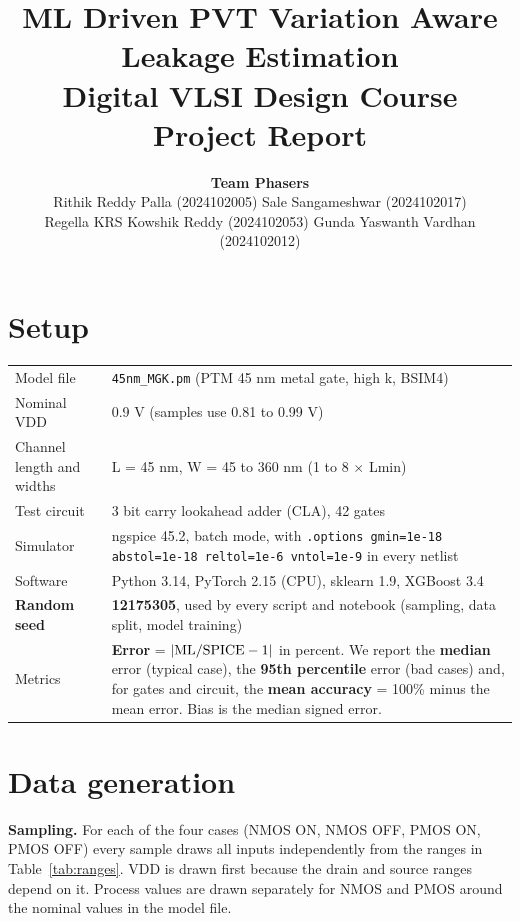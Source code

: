\documentclass[10pt,a4paper]{article}
\title{\vspace{-1cm}\textbf{ML Driven PVT Variation Aware Leakage Estimation}\\[2pt]
\large Digital VLSI Design Course Project Report}
\author{\textbf{Team Phasers}\\[2pt]
Rithik Reddy Palla (2024102005) \quad Sale Sangameshwar (2024102017)\\
Regella KRS Kowshik Reddy (2024102053) \quad Gunda Yaswanth Vardhan (2024102012)}
\date{}
\begin{document}
\maketitle
\vspace{-0.8cm}

\section{Setup}

\begin{tabularx}{\linewidth}{@{}lX@{}}
\toprule
Model file & \texttt{45nm\_MGK.pm} (PTM 45 nm metal gate, high k, BSIM4)\\
Nominal VDD & 0.9 V (samples use 0.81 to 0.99 V)\\
Channel length and widths & L = 45 nm, W = 45 to 360 nm (1 to 8 $\times$ Lmin)\\
Test circuit & 3 bit carry lookahead adder (CLA), 42 gates\\
Simulator & ngspice 45.2, batch mode, with \texttt{.options gmin=1e-18 abstol=1e-18 reltol=1e-6 vntol=1e-9} in every netlist\\
Software & Python 3.14, PyTorch 2.15 (CPU), sklearn 1.9, XGBoost 3.4\\
\textbf{Random seed} & \textbf{12175305}, used by every script and notebook (sampling, data split, model training)\\
Metrics & \textbf{Error} = $|{\rm ML}/{\rm SPICE}-1|$ in percent. We report the \textbf{median} error (typical case), the \textbf{95th percentile} error (bad cases) and, for gates and circuit, the \textbf{mean accuracy} = 100\% minus the mean error. Bias is the median signed error.\\
\bottomrule
\end{tabularx}

\section{Data generation}

\textbf{Sampling.} For each of the four cases (NMOS ON, NMOS OFF, PMOS ON, PMOS OFF) every sample draws all inputs independently from the ranges in Table~\ref{tab:ranges}. VDD is drawn first because the drain and source ranges depend on it. Process values are drawn separately for NMOS and PMOS around the nominal values in the model file.
\end{document}
